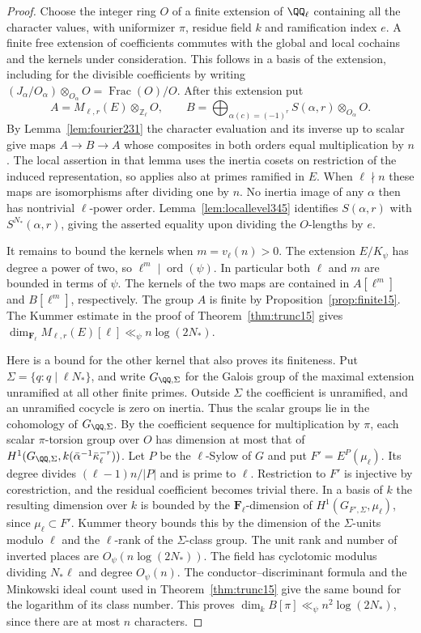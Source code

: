 \documentclass[a4paper,11pt]{article}
\theoremstyle{definition}
\theoremstyle{remark}
\newcommand{\ZZ}{\mathbb Z}\newcommand{\ord}{\operatorname{ord}}
\numberwithin{equation}{section}
\begin{document}
\begin{proof}
Choose the integer ring $O$ of a finite extension of $\QQ_\ell$
containing all the character values, with uniformizer $\pi$, residue
field $k$ and ramification index $e$. A finite free extension of
coefficients commutes with the global and local cochains and the
kernels under consideration. This follows in a basis of the
extension, including for the divisible coefficients by writing
$(J_\alpha/O_\alpha)\otimes_{O_\alpha}O=\operatorname{Frac}(O)/O$.
After this extension put
\[
 A=M_{\ell,r}(E)\otimes_{\ZZ_\ell}O,\qquad
 B=\bigoplus_{\alpha(c)=(-1)^r} S(\alpha,r)\otimes_{O_\alpha}O .
\]
By Lemma~\ref{lem:fourier231} the character evaluation and its
inverse up to scalar give maps $A\to B\to A$ whose composites
in both orders equal multiplication by $n$. The local assertion
in that lemma uses the inertia cosets on restriction of the
induced representation, so applies also at primes ramified in $E$.
When $\ell\nmid n$ these maps are isomorphisms after dividing
one by $n$. No inertia image of any $\alpha$ then has nontrivial
$\ell$-power order. Lemma~\ref{lem:locallevel345} identifies
$S(\alpha,r)$ with $S^{N_*}(\alpha,r)$, giving the asserted
equality upon dividing the $O$-lengths by $e$.

It remains to bound the kernels when $m=v_\ell(n)>0$.
The extension $E/K_\psi$ has degree a power of two, so
$\ell^m\mid\operatorname{ord}(\psi)$. In particular both $\ell$
and $m$ are bounded in terms of $\psi$. The kernels of the two maps
are contained in $A[\ell^m]$ and $B[\ell^m]$, respectively.
The group $A$ is finite by Proposition~\ref{prop:finite15}.
The Kummer estimate in the proof of Theorem~\ref{thm:trunc15} gives
$\dim_{\mathbf F_\ell}M_{\ell,r}(E)[\ell]\ll_\psi n\log(2N_*)$.

Here is a bound for the other kernel that also proves its finiteness.
Put $\Sigma=\{q:q\mid\ell N_*\}$, and write $G_{\QQ,\Sigma}$ for
the Galois group of the maximal extension unramified at all other
finite primes. Outside $\Sigma$ the coefficient is unramified, and an
unramified cocycle is zero on inertia. Thus the scalar groups lie in
the cohomology of $G_{\QQ,\Sigma}$. By the coefficient sequence
for multiplication by $\pi$, each scalar $\pi$-torsion group over
$O$ has dimension at most that of
$H^1(G_{\QQ,\Sigma},k(\bar\alpha^{-1}\bar\kappa_\ell^{-r}))$.
Let $P$ be the $\ell$-Sylow of $G$ and put $F'=E^P(\mu_\ell)$.
Its degree divides $(\ell-1)n/|P|$ and is prime to $\ell$.
Restriction to $F'$ is injective by corestriction, and the residual
coefficient becomes trivial there. In a basis of $k$ the resulting
dimension over $k$ is bounded by the $\mathbf F_\ell$-dimension
of $H^1(G_{F',\Sigma},\mu_\ell)$, since $\mu_\ell\subset F'$.
Kummer theory bounds this by the dimension of the $\Sigma$-units
modulo $\ell$ and the $\ell$-rank of the $\Sigma$-class group.
The unit rank and number of inverted places are
$O_\psi(n\log(2N_*))$. The field has cyclotomic modulus dividing
$N_*\ell$ and degree $O_\psi(n)$. The conductor--discriminant
formula and the Minkowski ideal count used in
Theorem~\ref{thm:trunc15} give the same bound for the logarithm
of its class number. This proves
$\dim_k B[\pi]\ll_\psi n^2\log(2N_*)$, since there are at most
$n$ characters.


\end{proof}
\end{document}
